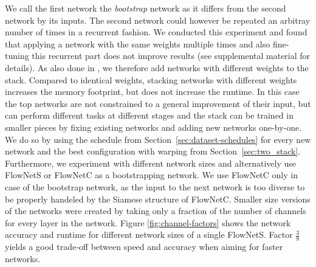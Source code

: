 \documentclass[10pt,twocolumn,letterpaper]{article}%
\begin{document}
We call the first network the \textit{bootstrap} network as it differs from the second network by its inputs. The second network could however be repeated an arbitray number of times in a recurrent fashion. We conducted this experiment and found that applying a network with the same weights multiple times and also fine-tuning this recurrent part does not improve results (see supplemental material for details). As also done in \cite{NYD16,Chen2016tnrd}, we therefore add networks with different weights to the stack. Compared to identical weights, stacking networks with different weights increases the memory footprint, but does not increase the runtime. In this case the top networks are not constrained to a general improvement of their input, but can perform different tasks at different stages and the stack can be trained in smaller pieces by fixing existing networks and adding new networks one-by-one. We do so by using the \chairsToThings schedule from Section~\ref{sec:dataset-schedules} for every new network and the best configuration with warping from Section~\ref{sec:two_stack}. Furthermore, we experiment with different network sizes and alternatively use FlowNetS or FlowNetC as a bootstrapping network. 
We use FlowNetC only in case of the bootstrap network, as the input to the next network is too diverse to be properly handeled by the Siamese structure of FlowNetC. 
Smaller size versions of the networks were created by taking only a fraction of the number of channels for every layer in the network. Figure \ref{fig:channel-factors} shows the network accuracy and runtime for different network sizes of a single FlowNetS. Factor $\frac38$ yields a good trade-off between speed and accuracy when aiming for faster networks. 
\end{document}
